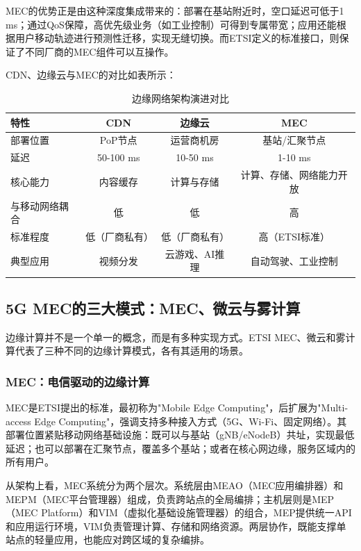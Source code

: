 MEC的优势正是由这种深度集成带来的：部署在基站附近时，空口延迟可低于1 ms；通过QoS保障，高优先级业务（如工业控制）可得到专属带宽；应用还能根据用户移动轨迹进行预测性迁移，实现无缝切换。而ETSI定义的标准接口，则保证了不同厂商的MEC组件可以互操作。

CDN、边缘云与MEC的对比如表所示：
\begin{table}[htbp]
\centering
\caption{边缘网络架构演进对比}
\begin{tabular}{|l|c|c|c|}
\hline
\textbf{特性} & \textbf{CDN} & \textbf{边缘云} & \textbf{MEC} \\
\hline
部署位置 & PoP节点 & 运营商机房 & 基站/汇聚节点 \\
延迟 & 50-100 ms & 10-50 ms & 1-10 ms \\
核心能力 & 内容缓存 & 计算与存储 & 计算、存储、网络能力开放 \\
与移动网络耦合 & 低 & 低 & 高 \\
标准程度 & 低（厂商私有） & 低（厂商私有） & 高（ETSI标准） \\
典型应用 & 视频分发 & 云游戏、AI推理 & 自动驾驶、工业控制 \\
\hline
\end{tabular}
\end{table}

\subsection{5G MEC的三大模式：MEC、微云与雾计算}

边缘计算并不是一个单一的概念，而是有多种实现方式。ETSI MEC、微云和雾计算代表了三种不同的边缘计算模式，各有其适用的场景。

\subsubsection{MEC：电信驱动的边缘计算}

MEC是ETSI提出的标准，最初称为"Mobile Edge Computing"，后扩展为"Multi-access Edge Computing"，强调支持多种接入方式（5G、Wi-Fi、固定网络）。其部署位置紧贴移动网络基础设施：既可以与基站（gNB/eNodeB）共址，实现最低延迟；也可以部署在汇聚节点，覆盖多个基站；或者在核心网边缘，服务区域内的所有用户。

从架构上看，MEC系统分为两个层次。系统层由MEAO（MEC应用编排器）和MEPM（MEC平台管理器）组成，负责跨站点的全局编排；主机层则是MEP（MEC Platform）和VIM（虚拟化基础设施管理器）的组合，MEP提供统一API和应用运行环境，VIM负责管理计算、存储和网络资源。两层协作，既能支撑单站点的轻量应用，也能应对跨区域的复杂编排。

